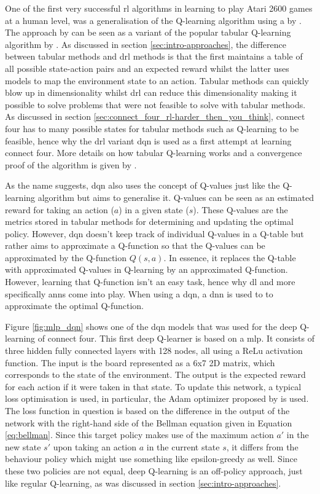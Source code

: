One of the first very successful \gls{rl} algorithms in learning to play Atari 2600 games at a human level, was a generalisation of the Q-learning algorithm using a  by \citet{dqn}.
The approach by \citet{dqn} can be seen as a  variant of the popular tabular Q-learning algorithm by \citet{qlearning}.
As discussed in section \ref{sec:intro-approaches}, the difference between tabular methods and \gls{drl} methods is that the first maintains a table of all possible state-action pairs and an expected reward whilst the latter uses  models to map the environment state to an action.
Tabular methods can quickly blow up in dimensionality whilst \gls{drl} can reduce this dimensionality making it possible to solve problems that were not feasible to solve with tabular methods.
As discussed in section \ref{sec:connect_four_rl-harder_then_you_think}, connect four has to many possible states for tabular methods such as Q-learning to be feasible, hence why the \gls{drl} variant \gls{dqn} is used as a first attempt at learning connect four.
More details on how tabular Q-learning works and a convergence proof of the algorithm is given by \citet{qlearning_proof}.

As the name suggests, \gls{dqn} also uses the concept of Q-values just like the Q-learning algorithm but aims to generalise it.
Q-values can be seen as an estimated reward for taking an action ($a$) in a given state ($s$).
These Q-values are the metrics stored in tabular methods for determining and updating the optimal policy.
However, \gls{dqn} doesn't keep track of individual Q-values in a Q-table but rather aims to approximate a Q-function so that the Q-values can be approximated by the Q-function $Q(s, a)$.
In essence, it replaces the Q-table with approximated Q-values in Q-learning by an approximated Q-function.
However, learning that Q-function isn't an easy task, hence why \gls{dl} and more specifically \glspl{ann} come into play.
When using a \gls{dqn}, a \gls{dnn} is used to to approximate the optimal Q-function.

Figure \ref{fig:mlp_dqn} shows one of the \gls{dqn} models that was used for the deep Q-learning of connect four.
This first deep Q-learner is based on a \gls{mlp}.
It consists of three hidden fully connected layers with 128 nodes, all using a ReLu activation function.
The input is the board represented as a 6x7 2D matrix, which corresponds to the state of the environment.
The output is the expected reward for each action if it were taken in that state.
To update this network, a typical loss optimisation is used, in particular, the Adam optimizer proposed by \citet{adam} is used.
The loss function in question is based on the difference in the output of the network with the right-hand side of the Bellman equation given in Equation \ref{eq:bellman}.
Since this target policy makes use of the maximum action $a'$  in the new state $s'$ upon taking an action $a$ in the current state $s$, it differs from the behaviour policy which might use something like epsilon-greedy as well.
Since these two policies are not equal, deep Q-learning is an off-policy approach, just like regular Q-learning, as was discussed in section \ref{sec:intro-approaches}.


